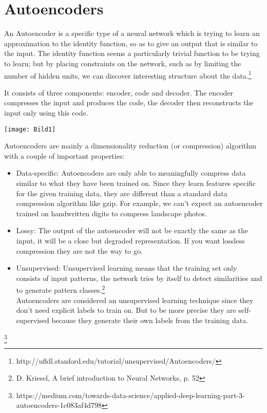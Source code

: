 \documentclass[12pt]{article}
\begin{document}
   
   \section{Autoencoders}
   
   An Autoencoder is a specific type of a neural network which is trying to learn an approximation to the identity function, so as to give an output that is similar to the input. The identity function seems a particularly trivial function to be trying to learn; but by placing constraints on the network, such as by limiting the number of hidden units, we can discover interesting structure about the data.\footnote{http://ufldl.stanford.edu/tutorial/unsupervised/Autoencoders/}
   
   It consists of three components: encoder, code and decoder. The encoder compresses the input and produces the code, the decoder then reconstructs the input only using this code.\\
   
   \begin{center}
   	\texttt{[image: Bild1]}
   \end{center}
   
   Autoencoders are mainly a dimensionality reduction (or compression) algorithm with a couple of important properties:
   
    \begin{itemize}
    	
    \item Data-specific: Autoencoders are only able to meaningfully compress data similar to what they have been trained on. Since they learn features specific for the given training data, they are different than a standard data compression algorithm like gzip. For example, we can’t expect an autoencoder trained on handwritten digits to compress landscape photos.
    
    \item Lossy: The output of the autoencoder will not be exactly the same as the input, it will be a close but degraded representation. If you want lossless compression they are not the way to go.
   
   \item Unsupervised: Unsupervised learning means that the training set only consists of input patterns, the network tries by itself to detect similarities and to generate pattern classes.\footnote{D. Kriesel, A brief introduction to Neural Networks, p. 52}\\ 
   Autoencoders are considered an unsupervised learning technique since they don’t need explicit labels to train on. But to be more precise they are self-supervised because they generate their own labels from the training data.
   
  \end{itemize}\footnote{https://medium.com/towards-data-science/applied-deep-learning-part-3-autoencoders-1c083af4d798}
  
\end{document}
